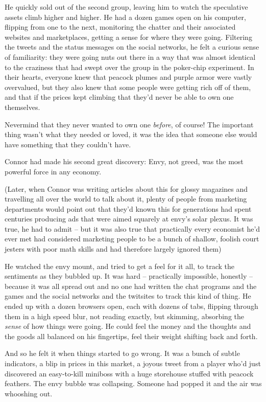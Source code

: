 He quickly sold out of the second group, leaving him to watch the
speculative assets climb higher and higher. He had a dozen games
open on his computer, flipping from one to the next, monitoring the
chatter and their associated websites and marketplaces, getting a
sense for where they were going. Filtering the tweets and the
status messages on the social networks, he felt a curious sense of
familiarity: they were going nuts out there in a way that was
almost identical to the craziness that had swept over the group in
the poker-chip experiment. In their hearts, everyone knew that
peacock plumes and purple armor were vastly overvalued, but they
also knew that some people were getting rich off of them, and that
if the prices kept climbing that they'd never be able to own one
themselves.

Nevermind that they never wanted to own one \emph{before}, of
course! The important thing wasn't what they needed or loved, it
was the idea that someone else would have something that they
couldn't have.

Connor had made his second great discovery: Envy, not greed, was
the most powerful force in any economy.

(Later, when Connor was writing articles about this for glossy
magazines and travelling all over the world to talk about it,
plenty of people from marketing departments would point out that
they'd known this for generations had spent centuries producing ads
that were aimed squarely at envy's solar plexus. It was true, he
had to admit -- but it was also true that practically every
economist he'd ever met had considered marketing people to be a
bunch of shallow, foolish court jesters with poor math skills and
had therefore largely ignored them)

He watched the envy mount, and tried to get a feel for it all, to
track the sentiments as they bubbled up. It was hard -- practically
impossible, honestly -- because it was all spread out and no one
had written the chat programs and the games and the social networks
and the twitsites to track this kind of thing. He ended up with a
dozen browsers open, each with dozens of tabs, flipping through
them in a high speed blur, not reading exactly, but skimming,
absorbing the \emph{sense} of how things were going. He could feel
the money and the thoughts and the goods all balanced on his
fingertips, feel their weight shifting back and forth.

And so he felt it when things started to go wrong. It was a bunch
of subtle indicators, a blip in prices in this market, a joyous
tweet from a player who'd just discovered an easy-to-kill miniboss
with a huge storehouse stuffed with peacock feathers. The envy
bubble was collapsing. Someone had popped it and the air was
whooshing out.

